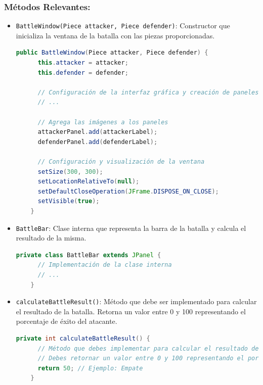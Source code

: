 \documentclass{article}
\begin{document}
\subsubsection{Métodos Relevantes:}
\begin{itemize}
  \item \texttt{BattleWindow(Piece attacker, Piece defender)}: Constructor que inicializa la ventana de la batalla con las piezas proporcionadas.
  \begin{lstlisting}[language=java,caption={Constructor \texttt{BattleWindow} que recibe las piezas atacante y defensora}]
    public BattleWindow(Piece attacker, Piece defender) {
      this.attacker = attacker;
      this.defender = defender;

      // Configuración de la interfaz gráfica y creación de paneles
      // ...

      // Agrega las imágenes a los paneles
      attackerPanel.add(attackerLabel);
      defenderPanel.add(defenderLabel);

      // Configuración y visualización de la ventana
      setSize(300, 300);
      setLocationRelativeTo(null);
      setDefaultCloseOperation(JFrame.DISPOSE_ON_CLOSE);
      setVisible(true);
    }
  \end{lstlisting}

  \item \texttt{BattleBar}: Clase interna que representa la barra de la batalla y calcula el resultado de la misma.
  \begin{lstlisting}[language=java,caption={Clase interna \texttt{BattleBar} en la clase \texttt{BattleWindow}}]
    private class BattleBar extends JPanel {
      // Implementación de la clase interna
      // ...
    }
  \end{lstlisting}

  \item \texttt{calculateBattleResult()}: Método que debe ser implementado para calcular el resultado de la batalla. Retorna un valor entre 0 y 100 representando el porcentaje de éxito del atacante.
  \begin{lstlisting}[language=java,caption={Método \texttt{calculateBattleResult} en la clase \texttt{BattleBar}}]
    private int calculateBattleResult() {
      // Método que debes implementar para calcular el resultado de la batalla
      // Debes retornar un valor entre 0 y 100 representando el porcentaje de éxito del atacante
      return 50; // Ejemplo: Empate
    }
  \end{lstlisting}
\end{itemize}
\end{document}
